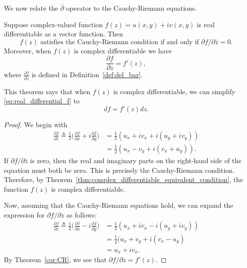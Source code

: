 We now relate the $\bar{\partial}$ operator to the Cauchy-Riemann equations.

\begin{svgraybox}
	\begin{theorem} Suppose complex-valued function $f(z) = u(x,y)+iv(x,y)$ is real differentiable as a vector function. Then
$$f(z) \text{ satisfies the Cauchy-Riemann condition if and only if }
		\partial f/\partial \bar{z} = 0.$$
		Moreover, when $f(z)$ is complex differentiable we have
		$$
		\frac{\partial f}{\partial z} = f'(z),
		$$
		where $\frac{\partial f}{\partial z}$ is defined in Definition~\ref{def:del_bar}. \label{theorem:del_bar}
	\end{theorem}
\end{svgraybox}

This theorem says that when $f(z)$ is complex differentiable, we can simplify \eqref{eq:real_differential_f} to
\begin{equation}
	df = f'(z) dz.
	\label{eq:complex_different_f}
\end{equation}

\begin{proof} We begin with 
	\begin{align*}
		\frac{\partial f}{\partial \bar{z}} \triangleq \frac{1}{2}\Big( \frac{\partial f}{\partial x} + i \frac{\partial f}{\partial y}\Big)
		&= \frac{1}{2} (u_x + iv_x + i(u_y + i v_y))  \\
		&= \frac{1}{2} (u_x- v_y + i(v_x + u_y)).
	\end{align*}	
	If $\partial f/\partial \bar{z}$ is zero, then the real and imaginary parts on the right-hand side of the equation must both be zero. This is precisely the Cauchy-Riemann condition. Therefore, by Theorem~\ref{thm:complex_differentiable_equivalent_condition}, the function $f(z)$ is complex differentiable.
	
	
	Now, assuming that the Cauchy-Riemann equations hold, we can expand the expression for ${\partial f}/{\partial z}$ as follows:
	\begin{align*}
		\frac{\partial f}{\partial z} \triangleq \frac{1}{2}\Big( \frac{\partial f}{\partial x} - i \frac{\partial f}{\partial y}\Big)
		&= \frac{1}{2} (u_x + iv_x - i(u_y + i v_y)) \\ 
		&= \frac{1}{2} (u_x + v_y + i(v_x-u_y)  \\
		&= u_x + iv_x .
	\end{align*}
	By Theorem~\ref{cor:CR}, we see that $\partial f/ \partial z = f'(z)$.
\end{proof}




